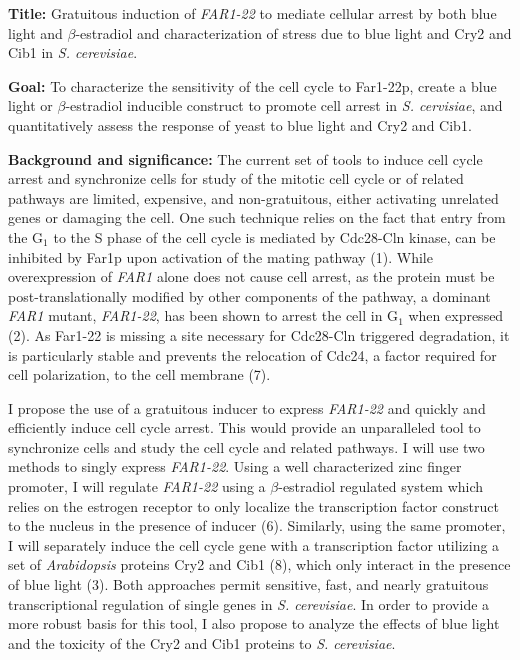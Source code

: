 \documentclass[12pt]{article}
\begin{document}
\textbf{Title:} Gratuitous induction of \emph{FAR1-22} to mediate cellular arrest by both blue light and $\beta$-estradiol and characterization of stress due to blue light and Cry2 and Cib1 in \emph{S. cerevisiae}. %

\textbf{Goal:} To characterize the sensitivity of the cell cycle to Far1-22p, create a blue light or $\beta$-estradiol inducible construct to promote cell arrest in \emph{S. cervisiae}, and quantitatively assess the response of yeast to blue light and Cry2 and Cib1.

\textbf{Background and significance:} 
The current set of tools to induce cell cycle arrest and synchronize cells for study of the mitotic cell cycle or of related pathways are limited, expensive, and non-gratuitous, either activating unrelated genes or damaging the cell. One such technique relies on the fact that entry from the G$_1$ to the S phase of the cell cycle is mediated by Cdc28-Cln kinase, can be inhibited by Far1p upon activation of the mating pathway (1). While overexpression of \emph{FAR1} alone does not cause cell arrest, as the protein must be post-translationally modified by other components of the pathway, a dominant \emph{FAR1} mutant, \emph{FAR1-22}, has been shown to arrest the cell in G$_1$ when expressed (2). As Far1-22 is missing a site necessary for Cdc28-Cln triggered degradation, it is particularly stable and prevents the relocation of Cdc24, a factor required for cell polarization, to the cell membrane (7).

I propose the use of a gratuitous inducer to express \emph{FAR1-22} and quickly and efficiently induce cell cycle arrest. This would provide an unparalleled tool to synchronize cells and study the cell cycle and related pathways.  I will use two methods to singly express \emph{FAR1-22}. Using a well characterized zinc finger promoter, I will regulate \emph{FAR1-22} using a $\beta$-estradiol regulated system which relies on the estrogen receptor to only localize the transcription factor construct to the nucleus in the presence of inducer (6). Similarly, using the same promoter, I will separately induce the cell cycle gene with a transcription factor utilizing a set of \emph{Arabidopsis} proteins Cry2 and Cib1 (8), which only interact in the presence of blue light (3). Both approaches permit sensitive, fast, and nearly gratuitous transcriptional regulation of single genes in \emph{S. cerevisiae}.  In order to provide a more robust basis for this tool, I also propose to analyze the effects of blue light and the toxicity of the Cry2 and Cib1 proteins to \emph{S. cerevisiae}.
\end{document}
